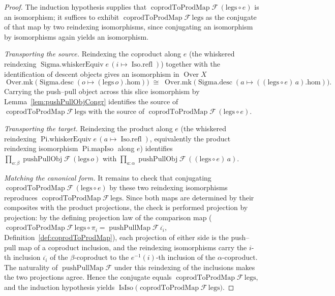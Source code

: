 \begin{proof}
  The induction hypothesis supplies that
  \(\operatorname{coprodToProdMap}\mathcal{F}\,(\mathrm{legs} \circ e)\) is an isomorphism; it suffices
  to exhibit \(\operatorname{coprodToProdMap}\mathcal{F}\,\mathrm{legs}\) as the conjugate of that map by
  two reindexing isomorphisms, since conjugating an isomorphism by isomorphisms again yields an
  isomorphism.

  \emph{Transporting the source.} Reindexing the coproduct along \(e\) (the whiskered reindexing
  \(\operatorname{Sigma.whiskerEquiv} e\,(i \mapsto \operatorname{Iso.refl})\)) together with the
  identification of descent objects gives an isomorphism in \(\operatorname{Over} X\)
  \[
    \operatorname{Over.mk}\bigl(\operatorname{Sigma.desc}(o \mapsto (\mathrm{legs}\,o).\mathrm{hom})\bigr)
      \;\cong\;
    \operatorname{Over.mk}\bigl(\operatorname{Sigma.desc}(a \mapsto ((\mathrm{legs} \circ e)\,a).
      \mathrm{hom})\bigr).
  \]
  Carrying the push--pull object across this slice isomorphism by
  Lemma~\ref{lem:pushPullObjCongr} identifies the source of
  \(\operatorname{coprodToProdMap}\mathcal{F}\,\mathrm{legs}\) with the source of
  \(\operatorname{coprodToProdMap}\mathcal{F}\,(\mathrm{legs} \circ e)\).

  \emph{Transporting the target.} Reindexing the product along \(e\) (the whiskered reindexing
  \(\operatorname{Pi.whiskerEquiv} e\,(a \mapsto \operatorname{Iso.refl})\), equivalently the
  product reindexing isomorphism \(\operatorname{Pi.mapIso}\) along \(e\)) identifies
  \(\prod_{o : \beta} \operatorname{pushPullObj}\mathcal{F}\,(\mathrm{legs}\,o)\) with
  \(\prod_{a : \alpha} \operatorname{pushPullObj}\mathcal{F}\,((\mathrm{legs} \circ e)\,a)\).

  \emph{Matching the canonical form.} It remains to check that conjugating
  \(\operatorname{coprodToProdMap}\mathcal{F}\,(\mathrm{legs} \circ e)\) by these two reindexing
  isomorphisms reproduces \(\operatorname{coprodToProdMap}\mathcal{F}\,\mathrm{legs}\). Since both maps
  are determined by their composites with the product projections, the check is performed projection by
  projection: by the defining projection law of the comparison map
  (\(\operatorname{coprodToProdMap}\mathcal{F}\,\mathrm{legs} \circ \pi_i =
  \operatorname{pushPullMap}\mathcal{F}\,\overline{\iota_i}\), Definition~\ref{def:coprodToProdMap}),
  each projection of either side is the push--pull map of a coproduct inclusion, and the reindexing
  isomorphisms carry the \(i\)-th inclusion \(\overline{\iota_i}\) of the \(\beta\)-coproduct to the
  \(e^{-1}(i)\)-th inclusion of the \(\alpha\)-coproduct. The naturality of
  \(\operatorname{pushPullMap}\mathcal{F}\) under this reindexing of the inclusions makes the two
  projections agree. Hence the conjugate equals
  \(\operatorname{coprodToProdMap}\mathcal{F}\,\mathrm{legs}\), and the induction hypothesis yields
  \(\operatorname{IsIso}\bigl(\operatorname{coprodToProdMap}\mathcal{F}\,\mathrm{legs}\bigr)\).
\end{proof}


